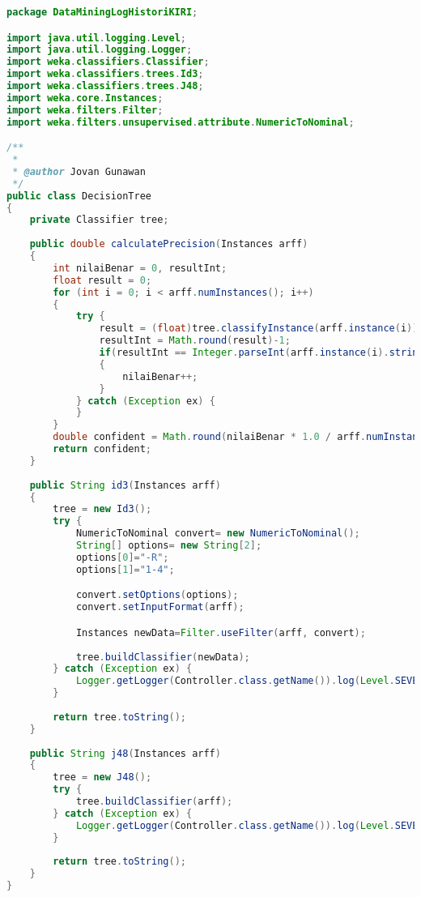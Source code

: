 \begin{lstlisting}[language=Java,basicstyle=\tiny,caption=DecisionTree.java]
package DataMiningLogHistoriKIRI;

import java.util.logging.Level;
import java.util.logging.Logger;
import weka.classifiers.Classifier;
import weka.classifiers.trees.Id3;
import weka.classifiers.trees.J48;
import weka.core.Instances;
import weka.filters.Filter;
import weka.filters.unsupervised.attribute.NumericToNominal;

/**
 *
 * @author Jovan Gunawan
 */
public class DecisionTree 
{
    private Classifier tree;
    
    public double calculatePrecision(Instances arff)
    {
        int nilaiBenar = 0, resultInt;
        float result = 0;
        for (int i = 0; i < arff.numInstances(); i++)
        {    
            try {
                result = (float)tree.classifyInstance(arff.instance(i));
                resultInt = Math.round(result)-1;
                if(resultInt == Integer.parseInt(arff.instance(i).stringValue(4)))
                {
                    nilaiBenar++;
                }
            } catch (Exception ex) {
            }
        }
        double confident = Math.round(nilaiBenar * 1.0 / arff.numInstances() * 10000)/100.0;
        return confident;
    }
    
    public String id3(Instances arff)
    {
        tree = new Id3();
        try {
            NumericToNominal convert= new NumericToNominal();
            String[] options= new String[2];
            options[0]="-R";
            options[1]="1-4"; 

            convert.setOptions(options);
            convert.setInputFormat(arff);

            Instances newData=Filter.useFilter(arff, convert);
            
            tree.buildClassifier(newData);
        } catch (Exception ex) {
            Logger.getLogger(Controller.class.getName()).log(Level.SEVERE, null, ex);
        }
        
        return tree.toString();
    }
    
    public String j48(Instances arff)
    {
        tree = new J48();
        try {
            tree.buildClassifier(arff);
        } catch (Exception ex) {
            Logger.getLogger(Controller.class.getName()).log(Level.SEVERE, null, ex);
        }
        
        return tree.toString();
    }
}
\end{lstlisting}

